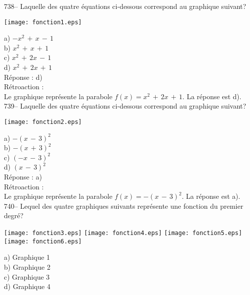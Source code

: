 ﻿\documentclass[letterpaper, 12pt]{article}
\begin{document}
738-- Laquelle des quatre \'equations ci-dessous correspond au graphique
suivant?\\
    \begin{center}
    \texttt{[image: fonction1.eps]}
    \end{center}

a) $-x^{2}\,+\,x\,-\,1$\\
b) $x^{2}\,+\,x\,+\,1$\\
c) $x^{2}\,+\,2x\,-\,1$\\
d) $x^{2}\,+\,2x\,+\,1$\\

R\'eponse : d)\\

R\'etroaction : \\
Le graphique repr\'esente la parabole $f(x)=x^{2}\,+\,2x\,+\,1$.  La
r\'eponse est d).\\

739-- Laquelle des quatre \'equations ci-dessous correspond au graphique
suivant?\\
    \begin{center}
    \texttt{[image: fonction2.eps]}
    \end{center}

a) $-(x\,-\,3)^{2}$\\
b) $-(x\,+\,3)^{2}$\\
c) $(-x\,-\,3)^{2}$\\
d) $(x\,-\,3)^{2}$\\

R\'eponse : a)\\

R\'etroaction : \\
Le graphique repr\'esente la parabole $f(x)=-(x\,-\,3)^{2}$.  La r\'eponse
est a).  \\

740-- Lequel des quatre graphiques suivants repr\'esente une fonction du
premier degr\'e?\\
    \begin{center}
    \texttt{[image: fonction3.eps]}
\texttt{[image: fonction4.eps]}
\texttt{[image: fonction5.eps]}
\texttt{[image: fonction6.eps]}
    \end{center}
a) Graphique 1\\
b) Graphique 2\\
c) Graphique 3\\
d) Graphique 4\\
\end{document}
